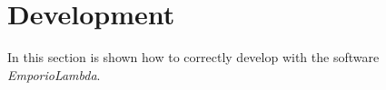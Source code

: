 \section{Development}
In this section is shown how to correctly develop with the software \textit{EmporioLambda}.





